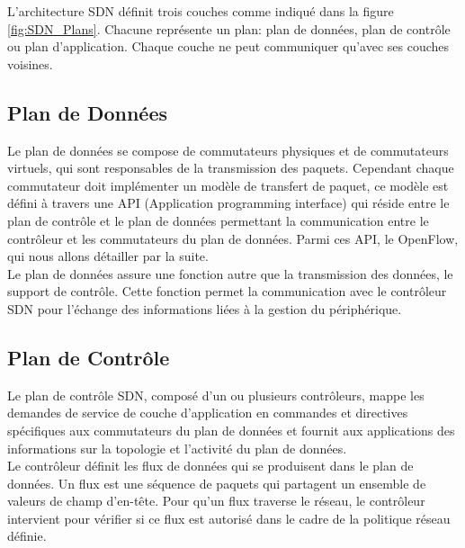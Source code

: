 L’architecture SDN définit trois couches comme indiqué dans la figure \ref{fig:SDN_Plans}. Chacune représente un plan: plan de données, plan de contrôle ou plan d’application. Chaque couche ne peut communiquer qu’avec ses couches voisines. 

\subsection{Plan de Données}
Le plan de données se compose de commutateurs physiques et de commutateurs virtuels, qui sont responsables de la transmission des paquets. Cependant chaque commutateur doit implémenter un modèle de transfert de paquet, ce modèle est défini à travers une API (Application programming interface) qui réside entre le plan de contrôle et le plan de données permettant la communication entre le contrôleur et les commutateurs du plan de données. Parmi ces API, le OpenFlow, qui nous allons détailler par la suite.\\

\noindent Le plan de données assure une fonction autre que la transmission des données, le support de contrôle. Cette fonction permet la communication avec le contrôleur SDN pour l’échange des informations liées à la gestion du périphérique.  

\subsection{Plan de Contrôle}
Le plan de contrôle SDN, composé d’un ou plusieurs contrôleurs, mappe les demandes de service de couche d’application en commandes et directives spécifiques aux commutateurs du plan de données et fournit aux applications des informations sur la topologie et l’activité du plan de données.\\

\noindent Le contrôleur définit les flux de données qui se produisent dans le plan de données. Un flux est une séquence de paquets qui partagent un ensemble de valeurs de champ d'en-tête. Pour qu’un flux traverse le réseau, le contrôleur intervient pour vérifier si ce flux est autorisé dans le cadre de la politique réseau définie.\\


